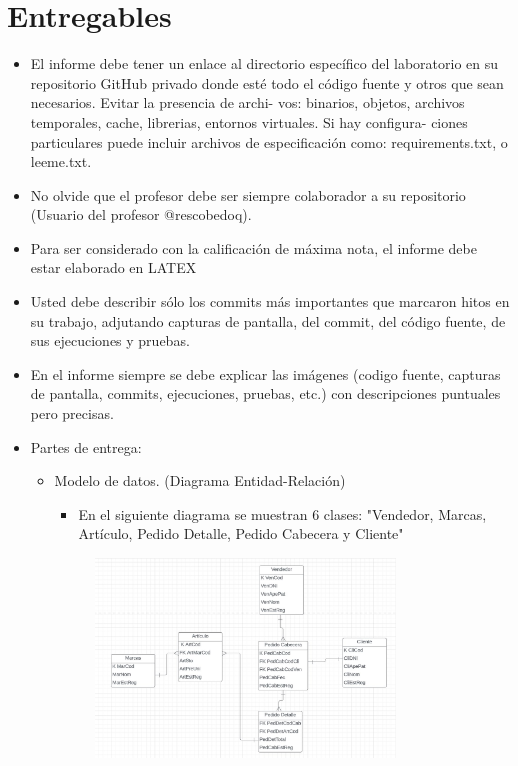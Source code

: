 \documentclass{article}
\begin{document}
    \section{Entregables}
    \begin{itemize}
        \item El informe debe tener un enlace al directorio específico del laboratorio en su repositorio GitHub
        privado donde esté todo el código fuente y otros que sean necesarios. Evitar la presencia de archi-
        vos: binarios, objetos, archivos temporales, cache, librerias, entornos virtuales. Si hay configura-
        ciones particulares puede incluir archivos de especificación como: requirements.txt, o leeme.txt.
        \item No olvide que el profesor debe ser siempre colaborador a su repositorio (Usuario del profesor
        @rescobedoq).
        \item Para ser considerado con la calificación de máxima nota, el informe debe estar elaborado en
        LATEX
        \item Usted debe describir sólo los commits más importantes que marcaron hitos en su trabajo,
        adjutando capturas de pantalla, del commit, del código fuente, de sus ejecuciones y pruebas.
        \item En el informe siempre se debe explicar las imágenes (codigo fuente, capturas de pantalla, commits,
        ejecuciones, pruebas, etc.) con descripciones puntuales pero precisas.
        \item Partes de entrega:
        \begin{itemize}
        
            \item Modelo de datos. (Diagrama Entidad-Relación)
            \begin{itemize}
                \item En el siguiente diagrama se muestran 6 clases: "Vendedor, Marcas, Artículo, Pedido Detalle, Pedido Cabecera y Cliente"
            \end{itemize}
            \begin{figure}[H]
		      \centering
                \includegraphics[width=0.8\textwidth,keepaspectratio]{img/Diagrama.jpeg}
	   \end{figure}
 

\end{itemize}
\end{itemize}
\end{document}
